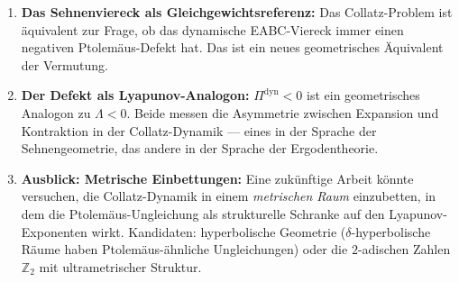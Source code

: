 \documentclass[12pt,a4paper]{article}
\newcommand{\Ptol}{\Pi}             %
\begin{document}
\begin{enumerate}[label=\textbf{(\arabic*)}, leftmargin=*]
  \item \textbf{Das Sehnenviereck als Gleichgewichtsreferenz:}
    Das Collatz-Problem ist äquivalent zur Frage, ob das dynamische
    EABC-Viereck immer einen negativen Ptolemäus-Defekt hat. Das ist
    ein neues geometrisches Äquivalent der Vermutung.

  \item \textbf{Der Defekt als Lyapunov-Analogon:}
    $\Ptol^{\mathrm{dyn}} < 0$ ist ein geometrisches Analogon zu $\Lambda < 0$.
    Beide messen die Asymmetrie zwischen Expansion und Kontraktion in der
    Collatz-Dynamik --- eines in der Sprache der Sehnengeometrie, das andere
    in der Sprache der Ergodentheorie.

  \item \textbf{Ausblick: Metrische Einbettungen:}
    Eine zukünftige Arbeit könnte versuchen, die Collatz-Dynamik in
    einem \emph{metrischen Raum} einzubetten, in dem die Ptolemäus-Ungleichung
    als strukturelle Schranke auf den Lyapunov-Exponenten wirkt.
    Kandidaten: hyperbolische Geometrie ($\delta$-hyperbolische Räume
    haben Ptolemäus-ähnliche Ungleichungen) oder die $2$-adischen Zahlen
    $\mathbb{Z}_2$ mit ultrametrischer Struktur.
\end{enumerate}
\end{document}
